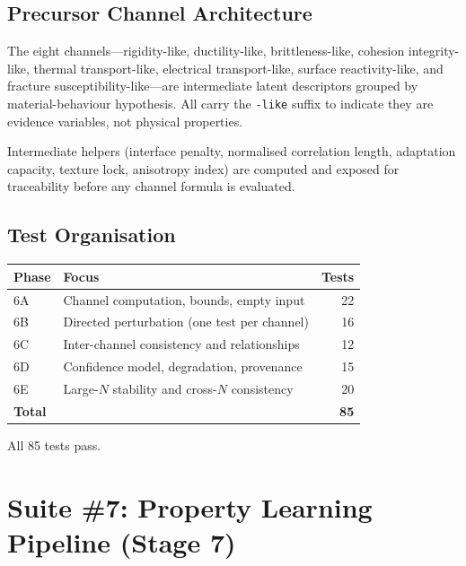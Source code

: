 \documentclass[11pt]{article}
\begin{document}
\subsection{Precursor Channel Architecture}

The eight channels---rigidity-like, ductility-like, brittleness-like,
cohesion integrity-like, thermal transport-like, electrical transport-like,
surface reactivity-like, and fracture susceptibility-like---are intermediate
latent descriptors grouped by material-behaviour hypothesis.  All carry the
\texttt{-like} suffix to indicate they are evidence variables, not physical
properties.

Intermediate helpers (interface penalty, normalised correlation length,
adaptation capacity, texture lock, anisotropy index) are computed and
exposed for traceability before any channel formula is evaluated.

\subsection{Test Organisation}

\begin{center}
\begin{tabular}{llr}
    \textbf{Phase} & \textbf{Focus} & \textbf{Tests} \\
    \midrule
    6A & Channel computation, bounds, empty input & 22 \\
    6B & Directed perturbation (one test per channel) & 16 \\
    6C & Inter-channel consistency and relationships & 12 \\
    6D & Confidence model, degradation, provenance & 15 \\
    6E & Large-$N$ stability and cross-$N$ consistency & 20 \\
    \midrule
    \textbf{Total} & & \textbf{85} \\
\end{tabular}
\end{center}

All 85 tests pass.

\section{Suite \#7: Property Learning Pipeline (Stage 7)}
\label{sec:suite7}
\end{document}
